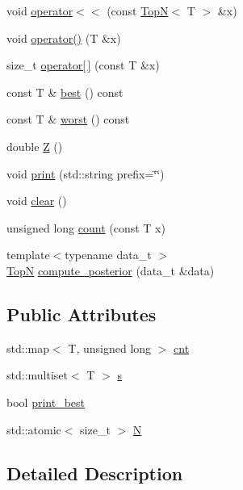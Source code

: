 \begin{DoxyCompactItemize}
\item 
void \hyperlink{class_top_n_a4a4459831455f21c152f99993aa0a274}{operator$<$$<$} (const \hyperlink{class_top_n}{TopN}$<$ T $>$ \&x)
\item 
void \hyperlink{class_top_n_a1bc031e453f4d32cbc4cf6df04da51bc}{operator()} (T \&x)
\item 
size\+\_\+t \hyperlink{class_top_n_a7eafee63f9094086c3193ff005cd9f0f}{operator\mbox{[}$\,$\mbox{]}} (const T \&x)
\item 
const T \& \hyperlink{class_top_n_a071e232087705b131627bd8a805d217c}{best} () const
\item 
const T \& \hyperlink{class_top_n_a29d25f1254f2c2e31612004593afa498}{worst} () const
\item 
double \hyperlink{class_top_n_a94191264b36318ce50e32c36018ef104}{Z} ()
\item 
void \hyperlink{class_top_n_a5064ec2e4e9f1defdc3cb62d9b7ddd00}{print} (std\+::string prefix=\char`\"{}\char`\"{})
\item 
void \hyperlink{class_top_n_a1867a08e8be4ffca2f3b6ea8161caa96}{clear} ()
\item 
unsigned long \hyperlink{class_top_n_a8bfb8d5daa31a4fd95196cb41f0ac1ce}{count} (const T x)
\item 
{\footnotesize template$<$typename data\+\_\+t $>$ }\\\hyperlink{class_top_n}{TopN} \hyperlink{class_top_n_a890f0653ac1c56e1af99a0f93dd3224a}{compute\+\_\+posterior} (data\+\_\+t \&data)
\end{DoxyCompactItemize}
\subsection*{Public Attributes}
\begin{DoxyCompactItemize}
\item 
std\+::map$<$ T, unsigned long $>$ \hyperlink{class_top_n_a0b10798cc83ac3b20bfe0dd5f1d45e86}{cnt}
\item 
std\+::multiset$<$ T $>$ \hyperlink{class_top_n_a1fea03a721d2485b03cc38834775c924}{s}
\item 
bool \hyperlink{class_top_n_a90472852f225e5b851446e4b7ced4856}{print\+\_\+best}
\item 
std\+::atomic$<$ size\+\_\+t $>$ \hyperlink{class_top_n_a1a4f701ca7296acfadcb6d0511247fcf}{N}
\end{DoxyCompactItemize}


\subsection{Detailed Description}

